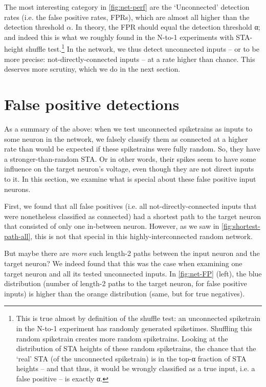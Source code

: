 The most interesting category in \cref{fig:net-perf} are the `Unconnected' detection rates (i.e. the false positive rates, FPRs), which are almost all higher than the detection threshold $α$. In theory, the FPR should equal the detection threshold α; and indeed this is what we roughly found in the N-to-1 experiments with STA-height shuffle test.\footnote{
    This is true almost by definition of the shuffle test: an unconnected spiketrain in the N-to-1 experiment has randomly generated spiketimes. Shuffling this random spiketrain creates more random spiketrains. Looking at the distribution of STA heights of these random spiketrains, the chance that the `real' STA (of the unconnected spiketrain) is in the top-α fraction of STA heights -- and that thus, it would be wrongly classified as a true input, i.e. a false positive -- is exactly α.
}
In the network, we thus detect unconnected inputs -- or to be more precise: not-directly-connected inputs -- at a rate higher than chance. This deserves more scrutiny, which we do in the next section.



\section{False positive detections}

As a summary of the above: when we test unconnected spiketrains as inputs to some neuron in the network, we falsely classify them as connected at a higher rate than would be expected if these spiketrains were fully random. So, they have a stronger-than-random STA. Or in other words, their spikes seem to have some influence on the target neuron's voltage, even though they are not direct inputs to it. In this section, we examine what is special about these false positive input neurons.

First, we found that all false positives (i.e. all not-directly-connected inputs that were nonetheless classified as connected) had a shortest path to the target neuron that consisted of only one in-between neuron. However, as we saw in \cref{fig:shortest-path-all}, this is not that special in this highly-interconnected random network.

But maybe there are \emph{more} such length-2 paths between the input neuron and the target neuron? We indeed found that this was the case when examining one target neuron and all its tested unconnected inputs. In \cref{fig:net-FP} (left), the blue distribution (number of length-2 paths to the target neuron, for false positive inputs) is higher than the orange distribution (same, but for true negatives).

